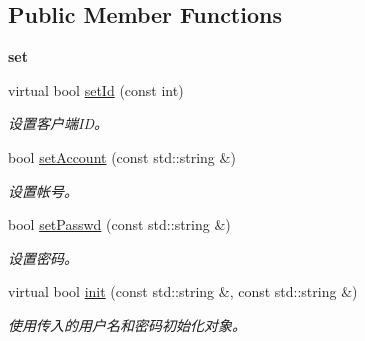 \subsection*{\-Public \-Member \-Functions}
\begin{Indent}{\bf set}\par
\begin{DoxyCompactItemize}
\item 
virtual bool \hyperlink{classepUser_a223ded3bb13a97064122c6836b754d48}{set\-Id} (const int)
\begin{DoxyCompactList}\small\item\em 设置客户端\-I\-D。 \end{DoxyCompactList}\item 
bool \hyperlink{classepUser_a8cd2e329a37b93500304b7578e2cc29b}{set\-Account} (const std\-::string \&)
\begin{DoxyCompactList}\small\item\em 设置帐号。 \end{DoxyCompactList}\item 
bool \hyperlink{classepUser_a733dba07ec00d2844152b6d079515566}{set\-Passwd} (const std\-::string \&)
\begin{DoxyCompactList}\small\item\em 设置密码。 \end{DoxyCompactList}\item 
virtual bool \hyperlink{classepUser_a60c355f9dd74f22949f686f3d0264ac2}{init} (const std\-::string \&, const std\-::string \&)
\begin{DoxyCompactList}\small\item\em 使用传入的用户名和密码初始化对象。 \end{DoxyCompactList}\end{DoxyCompactItemize}
\end{Indent}
